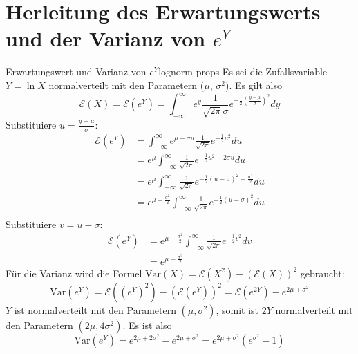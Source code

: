 \documentclass[11pt]{report} %
\begin{document}
\section{Herleitung des Erwartungswerts und der Varianz von $e^Y$}
\begin{Beweis}{Erwartungswert und Varianz von $e^Y$}{lognorm-props}
    Es sei die Zufallsvariable $Y=\ln{X}$ normalverteilt mit den Parametern ($\mu$, $\sigma^2$). Es gilt also
    $$\mathcal{E}(X)=\mathcal{E}(e^Y)=\int_{-\infty}^{\infty}e^y\frac{1}{\sqrt{2\pi}\sigma}e^{-\frac{1}{2}\left(\frac{y-\mu}{\sigma}\right)^2}dy$$
    Substituiere $u=\frac{y-\mu}{\sigma}$:
    \begin{align*}
        \mathcal{E}(e^Y)&=\int_{-\infty}^{\infty}e^{\mu+\sigma u}\frac{1}{\sqrt{2\pi}}e^{-\frac{1}{2}u^2}du\\
        &=e^\mu\int_{-\infty}^{\infty}\frac{1}{\sqrt{2\pi}}e^{-\frac{1}{2}u^2-2\sigma u}du\\
        &=e^\mu\int_{-\infty}^{\infty}\frac{1}{\sqrt{2\pi}}e^{-\frac{1}{2}(u-\sigma)^2+\frac{\sigma^2}{2}}du\\
        &=e^{\mu+\frac{\sigma^2}{2}}\int_{-\infty}^{\infty}\frac{1}{\sqrt{2\pi}}e^{-\frac{1}{2}(u-\sigma)^2}du\\
    \end{align*}
    Substituiere $v=u-\sigma$:
    \begin{align*}
        \mathcal{E}(e^Y)&=e^{\mu+\frac{\sigma^2}{2}}\int_{-\infty}^{\infty}\frac{1}{\sqrt{2\pi}}e^{-\frac{1}{2}v^2}dv\\
        &=e^{\mu+\frac{\sigma^2}{2}}
    \end{align*}
    Für die Varianz wird die Formel $\text{Var}(X)=\mathcal{E}(X^2)-(\mathcal{E}(X))^2$ gebraucht:
    $$\text{Var}(e^Y)=\mathcal{E}((e^Y)^2)-(\mathcal{E}(e^Y))^2=\mathcal{E}(e^{2Y})-e^{2\mu+\sigma^2}$$
    $Y$ ist normalverteilt mit den Parametern $(\mu, \sigma^2)$, somit ist $2Y$ normalverteilt mit den Parametern $(2\mu, 4\sigma^2)$. Es ist also
    $$\text{Var}(e^Y)=e^{2\mu+2\sigma^2}-e^{2\mu+\sigma^2}=e^{2\mu+\sigma^2}(e^{\sigma^2}-1) $$ 
\end{Beweis}
\end{document}
